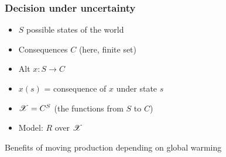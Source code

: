 \documentclass[french,english]{beamer}
\begin{document}
\begin{frame}
	\frametitle{Decision under uncertainty}
	\begin{itemize}
		\item $S$ possible states of the world
		\item Consequences $C$ (here, finite set)
		\item Alt $x: S \to C$
		\item $x(s)$ = consequence of $x$ under state $s$
		\item $\mathscr{X} = C^S$ (the functions from $S$ to $C$)
		\item Model: $R$ over $\mathscr{X}$
	\end{itemize}
	\begin{exampleblock}{Benefits of moving production depending on global warming}
		\centering
	\end{exampleblock}
\end{frame}
\end{document}

